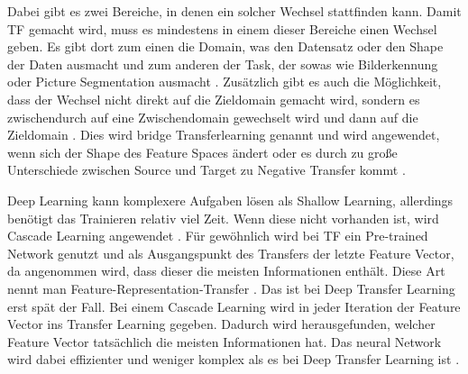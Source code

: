 Dabei gibt es zwei Bereiche, in denen ein solcher Wechsel stattfinden kann. Damit TF gemacht wird, 
muss es mindestens in einem dieser Bereiche einen Wechsel geben. Es gibt dort zum einen die Domain, was den Datensatz oder 
den Shape der Daten ausmacht und zum anderen der Task, der sowas wie Bilderkennung oder Picture Segmentation ausmacht \cite{survey_transfer}. 
Zusätzlich gibt es auch die Möglichkeit, dass der Wechsel 
nicht direkt auf die Zieldomain gemacht wird, sondern es zwischendurch auf eine Zwischendomain 
gewechselt wird und dann auf die Zieldomain \cite{bridge_transfer}. Dies wird 
bridge Transferlearning genannt und wird angewendet, wenn sich der Shape des Feature Spaces ändert oder 
es durch zu große Unterschiede zwischen Source und Target zu Negative Transfer kommt \cite{survey_transfer}.

Deep Learning kann komplexere Aufgaben lösen als Shallow Learning, allerdings benötigt das Trainieren relativ viel Zeit. 
Wenn diese nicht vorhanden ist, wird Cascade Learning angewendet \cite{cascor}.
Für gewöhnlich wird bei TF ein Pre-trained Network genutzt und als Ausgangspunkt des Transfers der letzte Feature Vector, da 
angenommen wird, dass dieser die meisten Informationen enthält. Diese Art nennt man Feature-Representation-Transfer 
\cite{survey_transfer}. Das ist bei Deep Transfer Learning erst spät der Fall. Bei einem Cascade Learning wird in jeder 
Iteration der Feature Vector ins Transfer Learning gegeben. Dadurch wird herausgefunden, welcher Feature Vector tatsächlich 
die meisten Informationen hat. 
Das neural Network wird dabei effizienter und weniger komplex als es bei Deep Transfer Learning ist \cite{phd_deep_cascade}.
        
